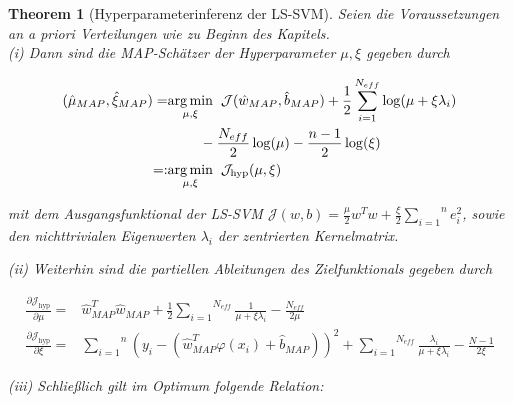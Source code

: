 \documentclass{report}
\theoremstyle{linebreak}
\newtheorem{theorem}[defi]{Theorem}
\begin{document}
\begin{theorem}[Hyperparameterinferenz der LS-SVM]

Seien die Voraussetzungen an a priori Verteilungen wie zu Beginn des Kapitels.\\
(i) Dann sind die MAP-Schätzer der Hyperparameter $\mu, \xi$ gegeben durch

\begin{align*}
	(\hat{\mu}_{MAP}, \hat{\xi}_{MAP}) =& \underset{\mu, \xi}{\arg \min}  \hspace{0.2cm}		\mathcal{J}(\hat{w}_{MAP}, \hat{b}_{MAP}) + \frac{1}{2}\sum_{i=1}^{N_{eff}}\log(\mu 		+ \xi \lambda_i) \\
	 & \hspace{0.8cm}- \frac{N_{eff}}{2}\log(\mu) - \frac{n -1 }{2}\log(\xi)\\
	=:& \underset{\mu, \xi}{\arg \min} \hspace{0.2cm}	\mathcal{J}_\text{hyp}(\mu, \xi)
\end{align*}



mit dem Ausgangsfunktional der LS-SVM 
$\mathcal{J}(w,b) = \frac{\mu}{2}w^T w + \frac{\xi}{2}\overset{n}{\underset{i=1}{\sum}} e_i ^2$,
sowie den nichttrivialen Eigenwerten $\lambda_i$ der zentrierten Kernelmatrix.

(ii) Weiterhin sind die partiellen Ableitungen des Zielfunktionals gegeben durch

\begin{align*}
	\frac{\partial \mathcal{J}_\text{hyp}}{\partial \mu} = & \hat{w}_{MAP}^T \hat{w}			_{MAP} + \frac{1}{2} \overset{N_{eff}}{\underset{i=1}{\sum}} \frac{1}{\mu + \xi 			\lambda_i} - \frac{N_{eff}}{2\mu} \\
    \frac{\partial \mathcal{J}_\text{hyp}}{\partial \xi} = & \overset{n}						{\underset{i=1}{\sum}}( y_i - (\hat{w}_{MAP}^T \varphi(x_i) + \hat{b}_{MAP}))^2 + \overset{N_{eff}}{\underset{i=1}{\sum}} \frac{\lambda_i}{\mu + \xi \lambda_i} - \frac{N-1}{2\xi}
\end{align*} 


(iii) Schließlich gilt im Optimum folgende Relation:


\end{theorem}



\nocite{*}


\end{document}

